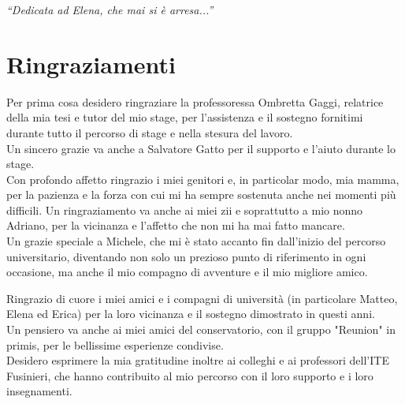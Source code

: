 \cleardoublepage
{}
{}

\begin{flushright}{
    \slshape
    ``Dedicata ad Elena, che mai si è arresa...''} \\
\end{flushright}

\begingroup
\let\clearpage\relax
\let\cleardoublepage\relax

\chapter*{Ringraziamenti}
\noindent\begin{small}Per prima cosa desidero ringraziare la professoressa Ombretta Gaggi, relatrice della mia tesi e tutor del mio stage, per l’assistenza e il sostegno fornitimi durante tutto il percorso di stage e nella stesura del lavoro.\\
Un sincero grazie va anche a Salvatore Gatto per il supporto e l’aiuto durante lo stage.\\

\noindent Con profondo affetto ringrazio i miei genitori e, in particolar modo, mia mamma, per la pazienza e la forza con cui mi ha sempre sostenuta anche nei momenti più difficili. Un ringraziamento va anche ai miei zii e soprattutto a mio nonno Adriano, per la vicinanza e l’affetto che non mi ha mai fatto mancare.\\

\noindent Un grazie speciale a Michele, che mi è stato accanto fin dall’inizio del percorso universitario, diventando non solo un prezioso punto di riferimento in ogni occasione, ma anche il mio compagno di avventure e il mio migliore amico.

\noindent Ringrazio di cuore i miei amici e i compagni di università (in particolare Matteo, Elena ed Erica) per la loro vicinanza e il sostegno dimostrato in questi anni.\\
Un pensiero va anche ai miei amici del conservatorio, con il gruppo "Reunion" in primis, per le bellissime esperienze condivise.\\

\noindent Desidero esprimere la mia gratitudine inoltre ai colleghi e ai professori dell’ITE Fusinieri, che hanno contribuito al mio percorso con il loro supporto e i loro insegnamenti.\\
\end{small}
\vspace{0.75cm}

\noindent{\myLocation, \myTime}
\hfill \textit{\myName}

\endgroup